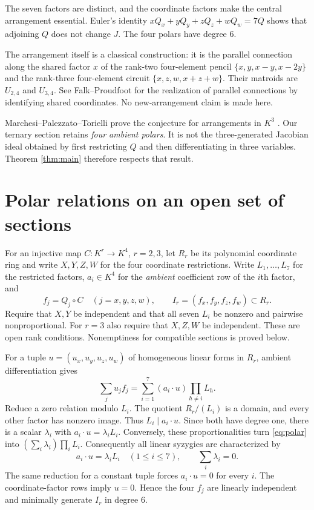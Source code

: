 \documentclass[11pt]{article}
\begin{document}
The seven factors are distinct, and the coordinate factors make the central
arrangement essential. Euler's identity
$xQ_x+yQ_y+zQ_z+wQ_w=7Q$ shows that adjoining $Q$ does not change $J$.
The four polars have degree $6$.

The arrangement itself is a classical construction: it is the parallel
connection along the shared factor $x$ of the rank-two four-element pencil
$\{x,y,x-y,x-2y\}$ and the rank-three four-element circuit
$\{x,z,w,x+z+w\}$. Their matroids are $U_{2,4}$ and $U_{3,4}$.
See Falk--Proudfoot \cite[\S4, Theorem 4.1]{FP} for the realization of
parallel connections by identifying shared coordinates. No new-arrangement
claim is made here.

Marchesi--Palezzato--Torielli prove the conjecture for arrangements in $K^3$
\cite[Theorem 4.7]{MPT}. Our ternary section retains \emph{four ambient
polars}. It is not the three-generated Jacobian ideal obtained by first
restricting $Q$ and then differentiating in three variables. Theorem
\ref{thm:main} therefore respects that result.

\section{Polar relations on an open set of sections}
For an injective map $C:K^r\to K^4$, $r=2,3$, let $R_r$ be its polynomial
coordinate ring and write $X,Y,Z,W$ for the four coordinate restrictions.
Write $L_1,\ldots,L_7$ for the restricted factors, $a_i\in K^4$ for the
\emph{ambient} coefficient row of the $i$th factor, and
\[
 f_j=Q_j\circ C\quad (j=x,y,z,w),\qquad
 I_r=(f_x,f_y,f_z,f_w)\subset R_r.
\]
Require that $X,Y$ be independent and that all seven $L_i$ be nonzero and
pairwise nonproportional. For $r=3$ also require that $X,Z,W$ be independent.
These are open rank conditions. Nonemptiness for compatible sections is
proved below.

For a tuple $u=(u_x,u_y,u_z,u_w)$ of homogeneous linear forms in $R_r$,
ambient differentiation gives
\begin{equation}\label{eq:polar}
 \sum_j u_jf_j=\sum_{i=1}^7(a_i\cdot u)\prod_{h\ne i}L_h.
\end{equation}
Reduce a zero relation modulo $L_i$. The quotient $R_r/(L_i)$ is a domain,
and every other factor has nonzero image. Thus $L_i\mid a_i\cdot u$.
Since both have degree one, there is a scalar $\lambda_i$ with
$a_i\cdot u=\lambda_iL_i$. Conversely, these proportionalities turn
\eqref{eq:polar} into $(\sum_i\lambda_i)\prod_iL_i$. Consequently all
linear syzygies are characterized by
\begin{equation}\label{eq:scalar}
 a_i\cdot u=\lambda_iL_i\quad(1\leq i\leq7),\qquad
 \sum_i\lambda_i=0.
\end{equation}
The same reduction for a constant tuple forces $a_i\cdot u=0$ for every
$i$. The coordinate-factor rows imply $u=0$. Hence the four $f_j$ are
linearly independent and minimally generate $I_r$ in degree $6$.
\end{document}
